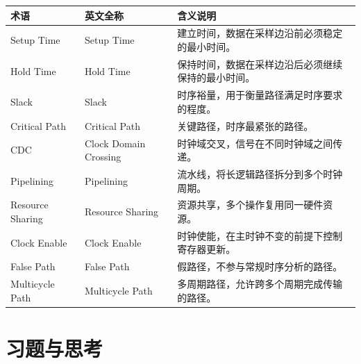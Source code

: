 \begin{longtable}[]{@{}
  >{\raggedright\arraybackslash}p{}
  >{\raggedright\arraybackslash}p{}
  >{\raggedright\arraybackslash}p{}@{}}
\toprule\noalign{}
\begin{minipage}[b]{\linewidth}\raggedright
术语
\end{minipage} & \begin{minipage}[b]{\linewidth}\raggedright
英文全称
\end{minipage} & \begin{minipage}[b]{\linewidth}\raggedright
含义说明
\end{minipage} \\
\midrule\noalign{}
\endhead
\bottomrule\noalign{}
\endlastfoot
Setup Time & Setup Time &
建立时间，数据在采样边沿前必须稳定的最小时间。 \\
Hold Time & Hold Time &
保持时间，数据在采样边沿后必须继续保持的最小时间。 \\
Slack & Slack & 时序裕量，用于衡量路径满足时序要求的程度。 \\
Critical Path & Critical Path & 关键路径，时序最紧张的路径。 \\
CDC & Clock Domain Crossing & 时钟域交叉，信号在不同时钟域之间传递。 \\
Pipelining & Pipelining & 流水线，将长逻辑路径拆分到多个时钟周期。 \\
Resource Sharing & Resource Sharing &
资源共享，多个操作复用同一硬件资源。 \\
Clock Enable & Clock Enable &
时钟使能，在主时钟不变的前提下控制寄存器更新。 \\
False Path & False Path & 假路径，不参与常规时序分析的路径。 \\
Multicycle Path & Multicycle Path &
多周期路径，允许跨多个周期完成传输的路径。 \\
\end{longtable}

\section{习题与思考}\label{ux4e60ux9898ux4e0eux601dux8003}


